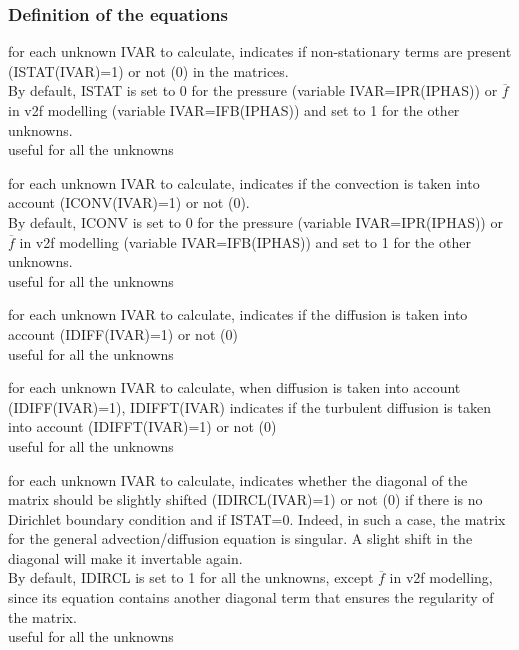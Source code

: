 \subsubsection{Definition of the equations}

{for each unknown IVAR to calculate, indicates if
non-stationary terms are present (ISTAT(IVAR)=1) or not (0) in the matrices.\\
By default, ISTAT is set to 0 for the pressure (variable IVAR=IPR(IPHAS))
or $\overline{f}$ in v2f modelling (variable IVAR=IFB(IPHAS)) and set to
1 for the other unknowns.\\
useful for all the unknowns}

{for each unknown IVAR to calculate, indicates if the
convection is taken into account (ICONV(IVAR)=1) or not (0).\\
By default, ICONV is set to 0 for the pressure (variable IVAR=IPR(IPHAS))
or $\overline{f}$ in v2f modelling (variable IVAR=IFB(IPHAS)) and set to
1 for the other unknowns.\\
useful for all the unknowns}

{for each unknown IVAR to calculate, indicates if the
diffusion is taken into account (IDIFF(IVAR)=1) or not (0)\\
useful for all the unknowns}

{for each unknown IVAR to calculate, when diffusion is taken
into account (IDIFF(IVAR)=1), IDIFFT(IVAR) indicates if the turbulent
diffusion is taken into account (IDIFFT(IVAR)=1) or not (0)\\
useful for all the unknowns }

{for each unknown IVAR to calculate, indicates whether the diagonal
of the matrix should be slightly shifted (IDIRCL(IVAR)=1) or not (0) if there
is no Dirichlet boundary condition and if ISTAT=0. Indeed, in such a case,
the matrix for the general advection/diffusion equation is singular. A slight
shift in the diagonal will make it invertable again.\\
By default, IDIRCL is set to 1 for all the unknowns, except $\overline{f}$ in
v2f modelling, since its equation contains another diagonal term that ensures
the regularity of the matrix.\\
useful for all the unknowns}

